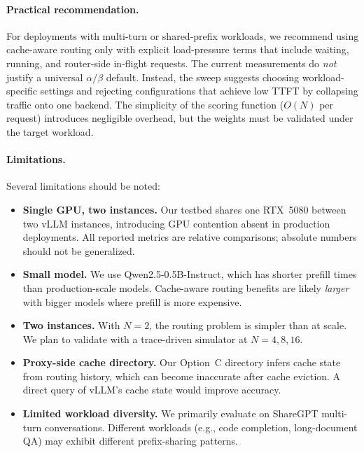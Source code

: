 \documentclass{article}
\begin{document}
\paragraph{Practical recommendation.}
For deployments with multi-turn or shared-prefix workloads, we recommend using cache-aware routing only with explicit load-pressure terms that include waiting, running, and router-side in-flight requests. The current measurements do \emph{not} justify a universal $\alpha/\beta$ default. Instead, the sweep suggests choosing workload-specific settings and rejecting configurations that achieve low TTFT by collapsing traffic onto one backend. The simplicity of the scoring function ($O(N)$ per request) introduces negligible overhead, but the weights must be validated under the target workload.

\paragraph{Limitations.}
Several limitations should be noted:
\begin{itemize}
    \item \textbf{Single GPU, two instances.} Our testbed shares one RTX~5080 between two vLLM instances, introducing GPU contention absent in production deployments. All reported metrics are relative comparisons; absolute numbers should not be generalized.
    \item \textbf{Small model.} We use Qwen2.5-0.5B-Instruct, which has shorter prefill times than production-scale models. Cache-aware routing benefits are likely \emph{larger} with bigger models where prefill is more expensive.
    \item \textbf{Two instances.} With $N = 2$, the routing problem is simpler than at scale. We plan to validate with a trace-driven simulator at $N = 4, 8, 16$.
    \item \textbf{Proxy-side cache directory.} Our Option~C directory infers cache state from routing history, which can become inaccurate after cache eviction. A direct query of vLLM's cache state would improve accuracy.
    \item \textbf{Limited workload diversity.} We primarily evaluate on ShareGPT multi-turn conversations. Different workloads (e.g., code completion, long-document QA) may exhibit different prefix-sharing patterns.
\end{itemize}

\end{document}

